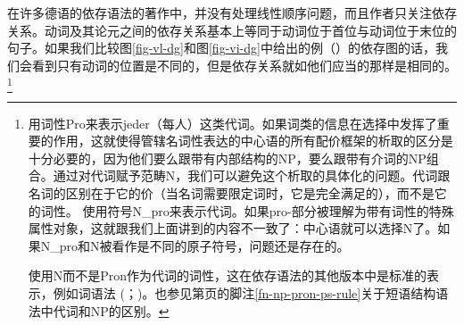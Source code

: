在许多德语的依存语法的著作中，并没有处理线性顺序问题，而且作者只关注依存关系。动词及其论元之间的依存关系基本上等同于动词位于首位与动词位于末位的句子。如果我们比较图\ref{fig-vl-dg}和图\ref{fig-vi-dg}中给出的例（）的依存图的话，我们会看到只有动词的位置是不同的，但是依存关系就如他们应当的那样是相同的。\footnote{%
 \citet{Eroms2000a}用词性Pro来表示jeder（每人）这类代词。如果词类的信息在选择中发挥了重要的作用，这就使得管辖名词性表达的中心语的所有配价框架的析取的区分是十分必要的，因为他们要么跟带有内部结构的NP，要么跟带有介词的NP组合。通过对代词赋予范畴N，我们可以避免这个析取的具体化的问题。代词跟名词的区别在于它的价（当名词需要限定词时，它是完全满足的），而不是它的词性。 \citet[]{EH2003a}使用符号N\_pro来表示代词。如果pro-部分被理解为带有词性的特殊属性对象，这就跟我们上面讲到的内容不一致了：中心语就可以选择N了。如果N\_pro和N被看作是不同的原子符号，问题还是存在的。

使用N而不是Pron作为代词的词性，这在依存语法的其他版本中是标准的表示，例如词语法 (\citealp[]{Hudson90a-u}；\citealp[]{Hudson2007a-u})。也参见第\pageref{fn-np-pron-ps-rule}页的脚注\ref{fn-np-pron-ps-rule}关于短语结构语法中代词和NP的区别。
}
